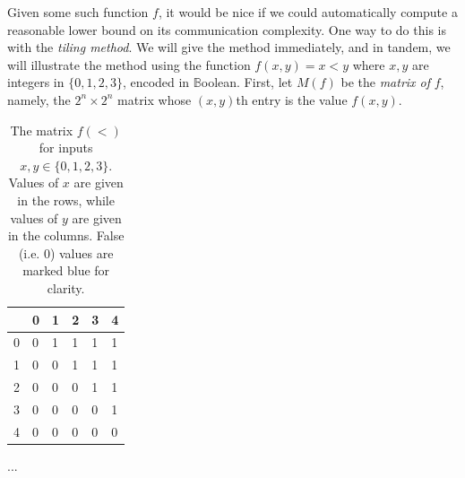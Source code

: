\documentclass[12pt]{article}
\begin{document}
Given some such function $f$, it would be nice if we could automatically compute
a reasonable lower bound on its communication complexity.
One way to do this is with the \emph{tiling method}.
We will give the method immediately, and in tandem, we will illustrate the method using
the function $f(x, y) = x < y$ where $x, y$ are integers in $\{ 0, 1, 2, 3 \}$, encoded in $\mathbb{B}$oolean.
First, let $M(f)$ be the \emph{matrix of }$f$,
	namely,
		the $2^n \times 2^n$ matrix whose $(x, y)$th entry
		is the value $f(x, y)$.
\begin{table}[h]
\centering
\begin{tabular}{|l|lllll|}
\hline
    & 0 & 1 & 2 & 3 & 4 \\\hline
0   & \cellcolor{blue!25}0 & 1 & 1 & 1 & 1 \\
1   & \cellcolor{blue!25}0 & \cellcolor{blue!25}0 & 1 & 1 & 1 \\
2   & \cellcolor{blue!25}0 & \cellcolor{blue!25}0 & \cellcolor{blue!25}0 & 1 & 1 \\
3   & \cellcolor{blue!25}0 & \cellcolor{blue!25}0 & \cellcolor{blue!25}0 & \cellcolor{blue!25}0 & 1 \\
4   & \cellcolor{blue!25}0 & \cellcolor{blue!25}0 & \cellcolor{blue!25}0 & \cellcolor{blue!25}0 & \cellcolor{blue!25}0\\\hline
\end{tabular}
\caption{The matrix $f(<)$ for inputs $x, y \in \{ 0, 1, 2, 3 \}$.  Values of $x$ are given in the rows, while values of $y$ are given in the columns.  False (i.e. 0) values are marked blue for clarity.}
\end{table}

\TODO ...

% 
% 
\end{document}
